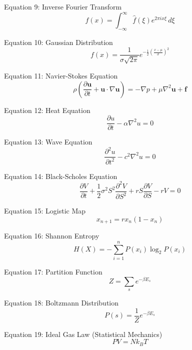 \documentclass{article}
\begin{document}
Equation 9: Inverse Fourier Transform
\begin{equation}
f(x) = \int_{-\infty}^{\infty} \hat{f}(\xi) e^{2\pi i x \xi} \, d\xi
\end{equation}

Equation 10: Gaussian Distribution
\begin{equation}
f(x) = \frac{1}{\sigma \sqrt{2\pi}} e^{-\frac{1}{2}\left(\frac{x-\mu}{\sigma}\right)^2}
\end{equation}

Equation 11: Navier-Stokes Equation
\begin{equation}
\rho \left( \frac{\partial \mathbf{u}}{\partial t} + \mathbf{u} \cdot \nabla \mathbf{u} \right) = -\nabla p + \mu \nabla^2 \mathbf{u} + \mathbf{f}
\end{equation}

Equation 12: Heat Equation
\begin{equation}
\frac{\partial u}{\partial t} - \alpha \nabla^2 u = 0
\end{equation}

Equation 13: Wave Equation
\begin{equation}
\frac{\partial^2 u}{\partial t^2} - c^2 \nabla^2 u = 0
\end{equation}

Equation 14: Black-Scholes Equation
\begin{equation}
\frac{\partial V}{\partial t} + \frac{1}{2} \sigma^2 S^2 \frac{\partial^2 V}{\partial S^2} + r S \frac{\partial V}{\partial S} - rV = 0
\end{equation}

Equation 15: Logistic Map
\begin{equation}
x_{n+1} = r x_n (1 - x_n)
\end{equation}

Equation 16: Shannon Entropy
\begin{equation}
H(X) = -\sum_{i=1}^n P(x_i) \log_2 P(x_i)
\end{equation}

Equation 17: Partition Function
\begin{equation}
Z = \sum_{s} e^{-\beta E_s}
\end{equation}

Equation 18: Boltzmann Distribution
\begin{equation}
P(s) = \frac{1}{Z} e^{-\beta E_s}
\end{equation}

Equation 19: Ideal Gas Law (Statistical Mechanics)
\begin{equation}
PV = N k_B T
\end{equation}
\end{document}
